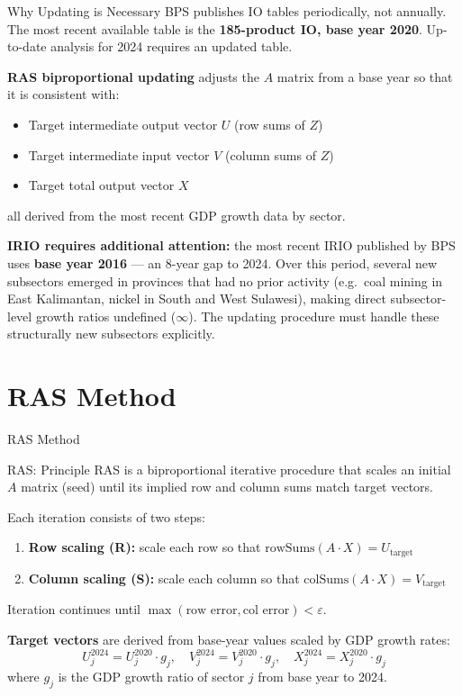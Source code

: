 \documentclass[aspectratio=169]{beamer}
\begin{document}
\begin{frame}{Why Updating is Necessary}
BPS publishes IO tables periodically, not annually. The most recent available table is the \textbf{185-product IO, base year 2020}. Up-to-date analysis for 2024 requires an updated table.

\medskip
\textbf{RAS biproportional updating} adjusts the $A$ matrix from a base year so that it is consistent with:
\begin{itemize}
  \item Target intermediate output vector $U$ (row sums of $Z$)
  \item Target intermediate input vector $V$ (column sums of $Z$)
  \item Target total output vector $X$
\end{itemize}
all derived from the most recent GDP growth data by sector.

\medskip
\textbf{IRIO requires additional attention:} the most recent IRIO published by BPS uses \textbf{base year 2016} --- an 8-year gap to 2024. Over this period, several new subsectors emerged in provinces that had no prior activity (e.g.\ coal mining in East Kalimantan, nickel in South and West Sulawesi), making direct subsector-level growth ratios undefined ($\infty$). The updating procedure must handle these structurally new subsectors explicitly.
\end{frame}

\section{RAS Method}

\begin{frame}{RAS Method}
\tableofcontents[currentsection]
\end{frame}

\begin{frame}{RAS: Principle}
RAS is a biproportional iterative procedure that scales an initial $A$ matrix (seed) until its implied row and column sums match target vectors.

\medskip
Each iteration consists of two steps:
\begin{enumerate}
  \item \textbf{Row scaling (R):} scale each row so that $\text{rowSums}(A \cdot X) = U_{\text{target}}$
  \item \textbf{Column scaling (S):} scale each column so that $\text{colSums}(A \cdot X) = V_{\text{target}}$
\end{enumerate}
Iteration continues until $\max(\text{row error}, \text{col error}) < \varepsilon$.

\medskip
\textbf{Target vectors} are derived from base-year values scaled by GDP growth rates:
\[
U_j^{2024} = U_j^{2020} \cdot g_j, \quad
V_j^{2024} = V_j^{2020} \cdot g_j, \quad
X_j^{2024} = X_j^{2020} \cdot g_j
\]
where $g_j$ is the GDP growth ratio of sector $j$ from base year to 2024.
\end{frame}
\end{document}

